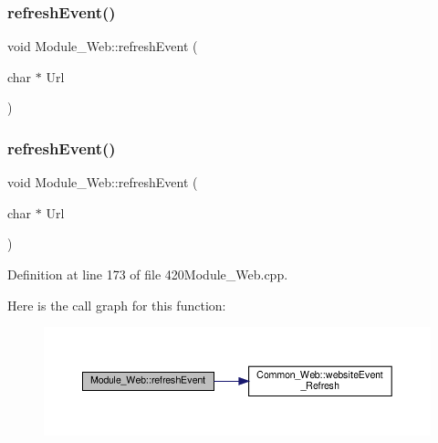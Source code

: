 \mbox{\label{class_module___web_a2f07ae87a674532e854e6b5760411157}} 
\subsubsection{\texorpdfstring{refresh\+Event()}{refreshEvent()}\hspace{0.1cm}{\footnotesize\ttfamily [1/2]}}
{\footnotesize\ttfamily void Module\+\_\+\+Web\+::refresh\+Event (\begin{DoxyParamCaption}\item[{char $\ast$}]{Url }\end{DoxyParamCaption})}

\mbox{\label{class_module___web_a2f07ae87a674532e854e6b5760411157}} 
\subsubsection{\texorpdfstring{refresh\+Event()}{refreshEvent()}\hspace{0.1cm}{\footnotesize\ttfamily [2/2]}}
{\footnotesize\ttfamily void Module\+\_\+\+Web\+::refresh\+Event (\begin{DoxyParamCaption}\item[{char $\ast$}]{Url }\end{DoxyParamCaption})}



Definition at line 173 of file 420\+Module\+\_\+\+Web.\+cpp.

Here is the call graph for this function\+:
\nopagebreak
\begin{figure}[H]
\begin{center}
\leavevmode
\includegraphics[width=350pt]{class_module___web_a2f07ae87a674532e854e6b5760411157_cgraph}
\end{center}
\end{figure}
\mbox{\label{class_module___web_a1aa0d196cbc4ad14f561e1334a0ae98f}} 

